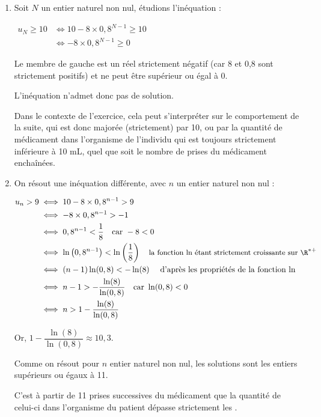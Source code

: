 \begin{enumerate}
Par limite de la somme, on en déduit : \quad $\lim\limits_{n\to +\infty} u_n = \lim\limits_{n\to +\infty} = 10 + 0 = 10$.

La suite $(u_n)$ converge donc vers 10.

Dans le contexte de l'exercice, cela signifie qu'au bout d'un nombre important de prises de ce médicament, l'organisme du patient contiendra une quantité de médicament qui tend vers les 10 mL.

	\item Soit $N$ un entier naturel non nul, étudions l'inéquation :

$\begin{aligned}
	u_N \geqslant 10
	&\iff 10 - 8 \times 0,8^{N-1} \geqslant 10\\
	&\iff -8\times 0,8^{N-1} \geqslant 0
\end{aligned} $

Le membre de gauche est un réel strictement négatif (car 8 et 0,8 sont strictement positifs) et ne peut être supérieur ou égal à 0.

L'inéquation n'admet donc pas de solution.

Dans le contexte de l'exercice, cela peut s'interpréter sur le comportement de la suite, qui est donc majorée (strictement) par 10, ou par la quantité de médicament dans l'organisme de l'individu qui est toujours strictement inférieure à 10 mL, quel que soit le nombre de prises du médicament enchaînées.

	\item On résout une inéquation différente, avec $n$ un entier naturel non nul :

$ \begin{aligned}
		u_n > 9
		&\iff 10 - 8 \times 0,8^{n-1} > 9\\
		&\iff - 8 \times 0,8^{n-1} > -1\\
		&\iff 0,8^{n-1} < \dfrac{1}{8} \quad \text{car } -8<0\\
		&\iff \ln\left(0,8^{n-1}\right) < \ln\left(\dfrac{1}{8}\right) \quad {\small \text{la fonction ln étant strictement croissante sur }\R^{*+}} \\
		&\iff (n-1)\ln(0,8) < -\ln(8) \quad \text{ d'après les propriétés de la fonction ln}\\
		&\iff n-1 > -\dfrac{\ln(8)}{\ln(0,8)} \quad \text{car } \ln(0,8) < 0\\
		&\iff n > 1 - \dfrac{\ln(8)}{\ln(0,8)}
\end{aligned}$

Or, $1 - \dfrac{\ln(8)}{\ln(0,8)} \approx 10,3$.

Comme on résout pour $n$ entier naturel non nul, les solutions sont les entiers supérieurs ou égaux à 11.

C'est à partir de 11 prises successives du médicament que la quantité de celui-ci dans l'organisme du patient dépasse strictement les .
\end{enumerate}

